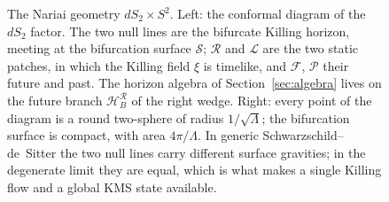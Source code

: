 \documentclass[11pt]{article}
\newcommand{\Nariai}{Nariai}
\begin{document}
\begin{figure}[t]
\centering
{}
\caption{The \Nariai{} geometry $dS_2 \times S^2$. Left: the conformal diagram of the $dS_2$ factor. The two null lines are the bifurcate Killing horizon, meeting at the bifurcation surface $\mathcal{S}$; $\mathcal{R}$ and $\mathcal{L}$ are the two static patches, in which the Killing field $\xi$ is timelike, and $\mathcal{F}$, $\mathcal{P}$ their future and past. The horizon algebra of Section~\ref{sec:algebra} lives on the future branch $\mathcal{H}^{\mathcal{R}}_B$ of the right wedge. Right: every point of the diagram is a round two-sphere of radius $1/\sqrt{\Lambda}$; the bifurcation surface is compact, with area $4\pi/\Lambda$. In generic Schwarzschild--de~Sitter the two null lines carry different surface gravities; in the degenerate limit they are equal, which is what makes a single Killing flow and a global KMS state available.}
\label{fig:nariai}
\end{figure}
\end{document}
